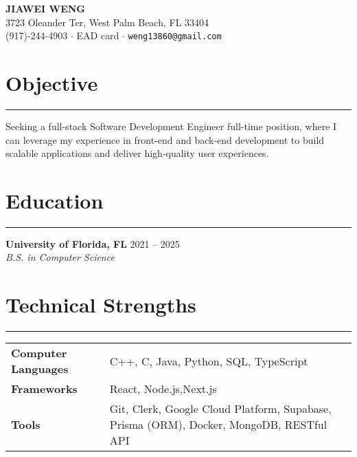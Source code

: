 \documentclass[11pt]{article}
\begin{document}
\begin{center}
    {\large \textbf{JIAWEI WENG}}\\  %
    3723 Oleander Ter, West Palm Beach, FL 33404 \\
    (917)-244-4903 \(\cdot\) EAD card \(\cdot\) \texttt{weng13860@gmail.com}
\end{center}

\section*{Objective}  
\vspace{-1.0em}
\hrule
\vspace{0.5em}

Seeking a full-stack Software Development Engineer full-time position, where I can leverage my experience in front-end and back-end development to build scalable applications and deliver high-quality user experiences.

\section*{Education}
\vspace{-1.0em}
\hrule
\vspace{0.5em}

\textbf{University of Florida, FL} \hfill 2021 -- 2025\\
\textit{B.S. in Computer Science}

\section*{Technical Strengths}
\vspace{-1.0em}
\hrule
\vspace{0.5em}

\begin{tabular}{@{} l p{12cm}}
\textbf{Computer Languages} & C++, C, Java, Python, SQL, TypeScript \\
\textbf{Frameworks}         & React, Node.js,Next.js \\
\textbf{Tools}              & Git, Clerk, Google Cloud Platform, Supabase, Prisma (ORM), Docker, MongoDB, RESTful API \\
\end{tabular}

\end{document}
